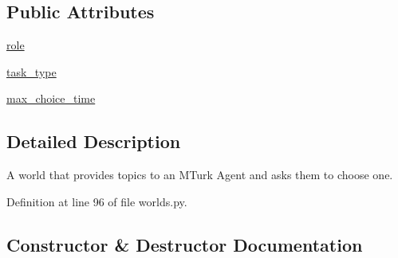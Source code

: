 \subsection*{Public Attributes}
\begin{DoxyCompactItemize}
\item 
\hyperlink{classprojects_1_1wizard__of__wikipedia_1_1mturk__evaluation__task_1_1worlds_1_1TopicChooseWorld_a2eb6c10647cb8207bfa083ef0a493d13}{role}
\item 
\hyperlink{classprojects_1_1wizard__of__wikipedia_1_1mturk__evaluation__task_1_1worlds_1_1TopicChooseWorld_a71ae18a662941ea82999f48817e1c784}{task\+\_\+type}
\item 
\hyperlink{classprojects_1_1wizard__of__wikipedia_1_1mturk__evaluation__task_1_1worlds_1_1TopicChooseWorld_ac951b666993c2d306f11a50d30fe2ed1}{max\+\_\+choice\+\_\+time}
\end{DoxyCompactItemize}


\subsection{Detailed Description}
\begin{DoxyVerb}A world that provides topics to an MTurk Agent and asks them to choose one.
\end{DoxyVerb}
 

Definition at line 96 of file worlds.\+py.



\subsection{Constructor \& Destructor Documentation}
\mbox{\label{classprojects_1_1wizard__of__wikipedia_1_1mturk__evaluation__task_1_1worlds_1_1TopicChooseWorld_a0c6930dd70c72544112407d55c0422ce}} 
